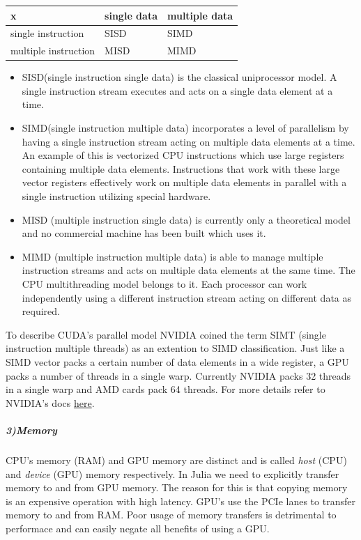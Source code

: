\documentclass[12pt,a4paper]{article}
\begin{document}
\begin{tabular}
{l | l | l}
x & single data & multiple data \\
\hline
single instruction & SISD & SIMD \\
multiple instruction & MISD & MIMD \\
\end{tabular}
\begin{itemize}
\item SISD(single instruction single data) is the classical uniprocessor model. A single instruction stream executes and acts on a single data element at a time.


\item SIMD(single instruction multiple data) incorporates a level of parallelism by having a single instruction stream acting on multiple data elements at a time. An example of this is vectorized CPU instructions which use large registers containing multiple data elements. Instructions that work with these large vector registers effectively work on multiple data elements in parallel with a single instruction utilizing special hardware.


\item MISD (multiple instruction single data) is currently only a theoretical model and no commercial machine has been built which uses it.


\item MIMD (multiple instruction multiple data) is able to manage multiple instruction streams and acts on multiple data elements at the same time. The CPU multithreading model belongs to it. Each processor can work independently using a different instruction stream acting on different data as required.

\end{itemize}
To describe CUDA's parallel model NVIDIA coined the term SIMT (single instruction multiple threads) as an extention to SIMD classification. Just like a SIMD vector packs a certain number of data elements in a wide register, a GPU packs a number of threads in a single warp. Currently NVIDIA packs 32 threads in a single warp and AMD cards pack 64 threads. For more details refer to NVIDIA's docs \href{https://docs.nvidia.com/cuda/cuda-c-programming-guide/index.html#hardware-implementation}{here}.

\subparagraph{3)Memory}
CPU's memory (RAM) and GPU memory are distinct and is called \emph{host} (CPU) and \emph{device} (GPU) memory respectively. In Julia we need to explicitly transfer memory to and from GPU memory. The reason for this is that copying memory is an expensive operation with high latency. GPU's use the PCIe lanes to transfer memory to and from RAM. Poor usage of memory transfers is detrimental to performace and can easily negate all benefits of using a GPU.
\end{document}
